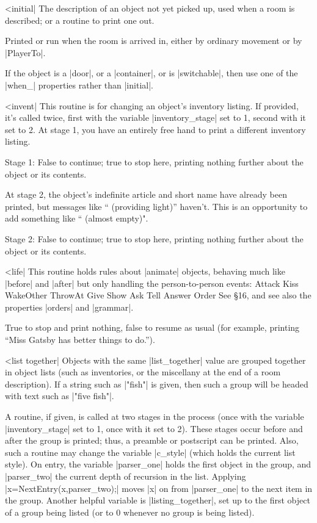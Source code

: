 ^^|initial|
\fo The description of an object not yet picked up, used when a
room is described; or a routine to print one out.

\fr Printed or run when the room is arrived in, either by ordinary
movement or by |PlayerTo|.

\warn If the object is a |door|, or a |container|, or is |switchable|,
then use one of the |when_| properties rather than |initial|.

\nrr

^^|invent|
This routine is for changing an object's inventory listing.  If provided,
it's called twice, first with the variable |inventory_stage| set to 1,
second with it set to 2.  At stage 1, you have an entirely free hand to
print a different inventory listing.

\rr Stage 1: False to continue; true to stop here, printing nothing further
about the object or its contents.

\noindent At stage 2, the object's indefinite article and short name have
already been printed, but messages like `` (providing light)'' haven't. 
This is an opportunity to add something like `` (almost empty)".

\rr Stage 2: False to continue; true to stop here, printing nothing further
about the object or its contents.

^^|life|
This routine holds rules about |animate| objects, behaving much like
|before| and |after| but only handling the person-to-person events:
\beginstt
Attack Kiss WakeOther ThrowAt Give Show Ask Tell Answer Order
\endtt
See \S 16, and see also the properties |orders| and |grammar|.

\rr True to stop and print nothing, false to resume as usual (for example,
printing ``Miss Gatsby has better things to do.'').

^^|list together|
\fo
Objects with the same |list_together| value are grouped together in
object lists (such as inventories, or the miscellany at the end of a
room description).  If a string such as |"fish"| is given, then such
a group will be headed with text such as |"five fish"|.

\noindent A routine, if given, is called at two stages in the process
(once with the variable |inventory_stage| set to 1, once with it set to 2).
These stages occur before and after the group is printed; thus, a
preamble or postscript can be printed.  Also, such a routine may
change the variable |c_style| (which holds the current list style).
On entry, the variable |parser_one| holds the first object in the
group, and |parser_two| the current depth of recursion in the list.
Applying |x=NextEntry(x,parser_two);| moves |x| on from |parser_one|
to the next item in the group.  Another helpful variable is
|listing_together|, set up to the first object of a group being listed
(or to 0 whenever no group is being listed).

